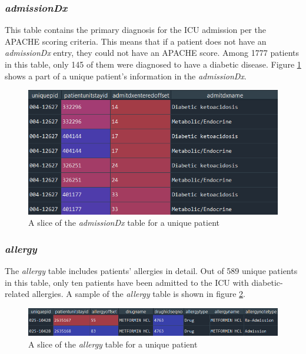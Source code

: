 \subsubsection{\textit{admissionDx}}
This table contains the primary diagnosis for the ICU admission per the APACHE scoring criteria. This means that if a patient does not have an \textit{admissionDx} entry, they could not have an \acrshort{APACHE} score. Among 1777 patients in this table, only 145 of them were diagnosed to have a diabetic disease. Figure \ref{fig:admissiondx} shows a part of a unique patient's information in the \textit{admissionDx}.

\begin{figure}[ht]
\centering
\includegraphics[width=15cm]{fig/chapter3/admissiondx_m.png}
\caption{A slice of the \textit{admissionDx} table for a unique patient}
\label{fig:admissiondx}
\end{figure}

\subsubsection{\textit{allergy}}
The \textit{allergy} table includes patients' allergies in detail. Out of 589 unique patients in this table, only ten patients have been admitted to the \acrshort{ICU} with diabetic-related allergies. A sample of the \textit{allergy} table is shown in figure \ref{fig:allergy}.

\begin{figure}[ht]
\centering
\includegraphics[width=15cm]{fig/chapter3/allergy_m.png}
\caption{A slice of the \textit{allergy} table for a unique patient}
\label{fig:allergy}
\end{figure}

